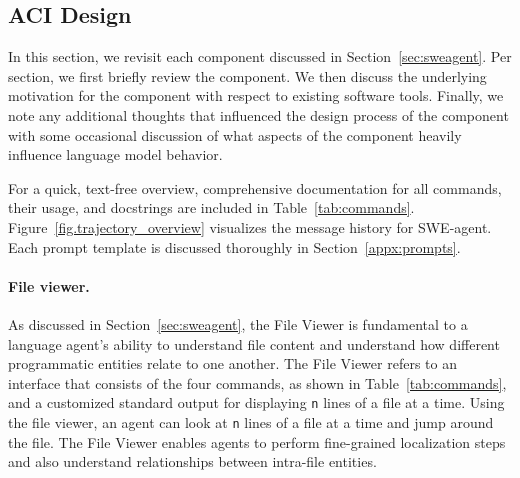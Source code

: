 \subsection{ACI Design}
\label{appx:interface:component-design}
In this section, we revisit each component discussed in Section~\ref{sec:sweagent}.
Per section, we first briefly review the component.
We then discuss the underlying motivation for the component with respect to existing software tools.
Finally, we note any additional thoughts that influenced the design process of the component with some occasional discussion of what aspects of the component heavily influence language model behavior.

For a quick, text-free overview, comprehensive documentation for all commands, their usage, and docstrings are included in Table~\ref{tab:commands}.
Figure~\ref{fig.trajectory_overview} visualizes the message history for SWE-agent.
Each prompt template is discussed thoroughly in Section~\ref{appx:prompts}.

\paragraph{File viewer.}
As discussed in Section~\ref{sec:sweagent}, the File Viewer is fundamental to a language agent's ability to understand file content and understand how different programmatic entities relate to one another.
The File Viewer refers to an interface that consists of the four commands, as shown in Table~\ref{tab:commands}, and a customized standard output for displaying \texttt{n} lines of a file at a time.
Using the file viewer, an agent can look at \texttt{n} lines of a file at a time and jump around the file.
The File Viewer enables agents to perform fine-grained localization steps and also understand relationships between intra-file entities.

